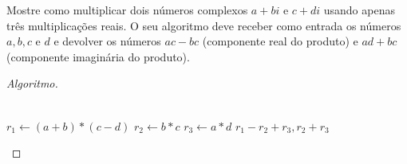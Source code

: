 \documentclass[12pt]{article}
\newenvironment{problem}[2][Ex]{\begin{trivlist}
\item[\hskip \labelsep {\bfseries #1}\hskip \labelsep {\bfseries #2.}]}{\end{trivlist}}
\begin{document}
\begin{problem}{13}
Mostre como multiplicar dois números complexos $a+bi$ e $c+di$ usando apenas três multiplicações reais. O seu algoritmo deve receber como entrada os números $a, b, c$ e $d$ e devolver os números $ac-bc$ (componente real do produto) e $ad+bc$ (componente imaginária do produto).
\end{problem}

\begin{proof}[Algoritmo]
\begin{algorithmic}
\\
\State $r_1 \gets (a+b)*(c-d)$
\State $r_2 \gets b*c$
\State $r_3 \gets a*d$
\State \Return $r_1-r_2+r_3, r_2+r_3$
\end{algorithmic}
\end{proof}
\end{document}
